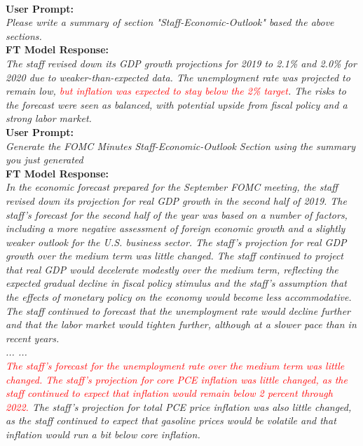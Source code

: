 ~\\
\textbf{User Prompt:}\\
{\footnotesize
\textit{
    Please write a summary of section "Staff-Economic-Outlook" based the above sections.
}}\\
\textbf{FT Model Response:}\\
{\footnotesize
\textit{
    The staff revised down its GDP growth projections for 2019 to 2.1\% and 2.0\% for 2020 due to weaker-than-expected data. The unemployment rate was projected to remain low, \textcolor{red}{but inflation was expected to stay below the 2\% target}. The risks to the forecast were seen as balanced, with potential upside from fiscal policy and a strong labor market.
}}
~\\
\textbf{User Prompt:}\\
{\footnotesize
\textit{Generate the FOMC Minutes Staff-Economic-Outlook Section using the summary you just generated}}\\
\textbf{FT Model Response:}\\
{\footnotesize
\textit{
In the economic forecast prepared for the September FOMC meeting, the staff revised down its projection for real GDP growth in the second half of 2019.  The staff’s forecast for the second half of the year was based on a number of factors, including a more negative assessment of foreign economic growth and a slightly weaker outlook for the U.S. business sector.  The staff’s projection for real GDP growth over the medium term was little changed.  The staff continued to project that real GDP would decelerate modestly over the medium term, reflecting the expected gradual decline in fiscal policy stimulus and the staff’s assumption that the effects of monetary policy on the economy would become less accommodative.  The staff continued to forecast that the unemployment rate would decline further and that the labor market would tighten further, although at a slower pace than in recent years. \\
... ... \\
\textcolor{red}{The staff’s forecast for the unemployment rate over the medium term was little changed.  The staff’s projection for core PCE inflation was little changed, as the staff continued to expect that inflation would remain below 2 percent through 2022.}  The staff’s projection for total PCE price inflation was also little changed, as the staff continued to expect that gasoline prices would be volatile and that inflation would run a bit below core inflation.}
}

